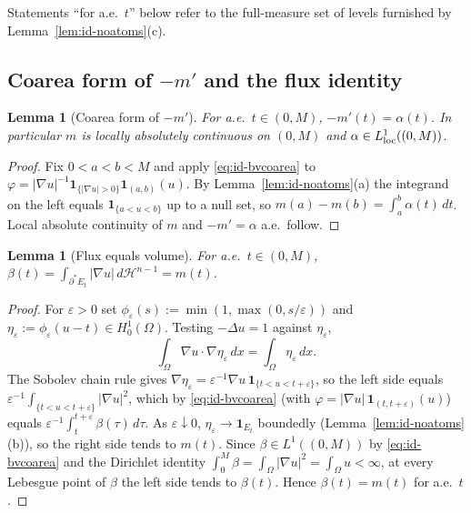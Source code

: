 \documentclass[11pt]{amsart}
\newtheorem{lemma}[theorem]{Lemma}
\theoremstyle{definition}
\newcommand{\Om}{\Omega}
\newcommand{\eps}{\varepsilon}
\newcommand{\Hn}{\mathcal H^{n-1}}
\begin{document}
\noindent
Statements ``for a.e.\ \(t\)'' below refer to the full-measure set of levels
furnished by Lemma~\ref{lem:id-noatoms}(c).

\subsection*{Coarea form of \texorpdfstring{\(-m'\)}{-m'} and the flux identity}

\begin{lemma}[Coarea form of \(-m'\)]\label{lem:id-coarea}
For a.e.\ \(t\in(0,M)\), \(-m'(t)=\alpha(t)\).  In particular \(m\) is locally
absolutely continuous on \((0,M)\) and \(\alpha\in L^1_{\rm loc}((0,M))\).
\end{lemma}

\begin{proof}
Fix \(0<a<b<M\) and apply \eqref{eq:id-bvcoarea} to
\(\varphi=|\nabla u|^{-1}\mathbf 1_{\{|\nabla u|>0\}}\mathbf 1_{(a,b)}(u)\).
By Lemma~\ref{lem:id-noatoms}(a) the integrand on the left equals
\(\mathbf 1_{\{a<u<b\}}\) up to a null set, so
\(m(a)-m(b)=\int_a^b\alpha(t)\,dt\).  Local absolute continuity of \(m\) and
\(-m'=\alpha\) a.e.\ follow.
\end{proof}

\begin{lemma}[Flux equals volume]\label{lem:id-flux}
For a.e.\ \(t\in(0,M)\), \(\beta(t)=\int_{\partial^*E_t}|\nabla u|\,d\Hn=m(t)\).
\end{lemma}

\begin{proof}
For \(\eps>0\) set \(\phi_\eps(s):=\min(1,\max(0,s/\eps))\) and
\(\eta_\eps:=\phi_\eps(u-t)\in H^1_0(\Om)\).  Testing \(-\Delta u=1\) against
\(\eta_\eps\),
\[
   \int_\Om\nabla u\cdot\nabla\eta_\eps\,dx=\int_\Om\eta_\eps\,dx .
\]
The Sobolev chain rule \cite[Thm.~3.99]{AFP2000} gives
\(\nabla\eta_\eps=\eps^{-1}\nabla u\,\mathbf 1_{\{t<u<t+\eps\}}\), so the left
side equals \(\eps^{-1}\int_{\{t<u<t+\eps\}}|\nabla u|^2\), which by
\eqref{eq:id-bvcoarea} (with \(\varphi=|\nabla u|\,\mathbf 1_{(t,t+\eps)}(u)\))
equals \(\eps^{-1}\int_t^{t+\eps}\beta(\tau)\,d\tau\).  As \(\eps\downarrow0\),
\(\eta_\eps\to\mathbf 1_{E_t}\) boundedly (Lemma~\ref{lem:id-noatoms}(b)), so the
right side tends to \(m(t)\).  Since \(\beta\in L^1((0,M))\) by
\eqref{eq:id-bvcoarea} and the Dirichlet identity
\(\int_0^M\beta=\int_\Om|\nabla u|^2=\int_\Om u<\infty\), at every Lebesgue
point of \(\beta\) the left side tends to \(\beta(t)\).  Hence
\(\beta(t)=m(t)\) for a.e.\ \(t\).
\end{proof}
\end{document}
